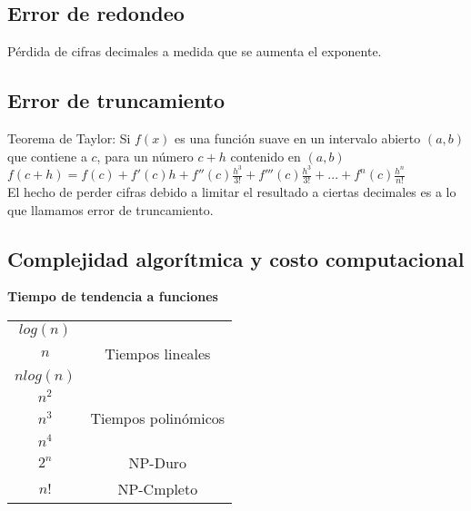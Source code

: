 \subsection{Error de redondeo} 
P\'erdida de cifras decimales a medida que se aumenta el exponente.

\subsection{Error de truncamiento}
Teorema de Taylor: Si $f(x)$ es una funci\'on suave en un intervalo abierto $(a,b)$ que contiene a $c$, para un n\'umero $c+h$ contenido en $(a,b)$ \\
$f(c+h)=f(c)+f'(c)h+f''(c)\frac{h^3}{3!}+f'''(c)\frac{h^3}{3!}+...+f^n(c)\frac{h^n}{n!}$ \\
El hecho de perder cifras debido a limitar el resultado a ciertas decimales es a lo que llamamos error de truncamiento.\\

\subsection{Complejidad algor\'itmica y costo computacional}

\begin{center}
\textbf{Tiempo de tendencia a funciones}\\
\begin{tabular}{| c | c |}
\hline
$log(n)$ & \\
$n$ & Tiempos lineales \\ 
$nlog(n)$ & \\
\hline
$n^2$ & \\
$n^3$ & Tiempos polin\'omicos \\ 
$n^4$ & \\
\hline
$2^n$ & NP-Duro \\
$n!$ & NP-Cmpleto\\
\hline
\end{tabular}
\end{center}
